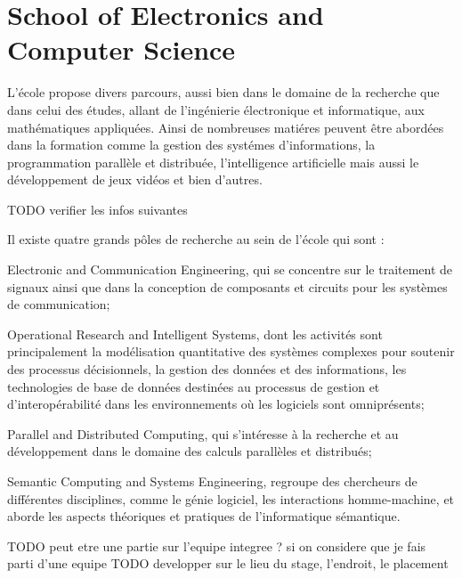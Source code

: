 \section{School of Electronics and Computer Science}

L'\'ecole propose divers parcours, aussi bien dans le domaine de la recherche que dans celui des \'etudes, allant de l'ing\'enierie \'electronique et informatique, aux math\'ematiques appliqu\'ees.
Ainsi de nombreuses mati\'eres peuvent \^etre abord\'ees dans la formation comme la gestion des syst\'emes d'informations, la programmation parall\`ele et distribu\'ee, l'intelligence artificielle mais aussi le d\'eveloppement de jeux vid\'eos et bien d'autres.

TODO verifier les infos suivantes

Il existe quatre grands p\^oles de recherche au sein de l'\'ecole qui sont :

Electronic and Communication Engineering, qui se concentre sur le traitement de signaux ainsi que dans la conception de composants et circuits pour les syst\`emes de communication;

Operational Research and Intelligent Systems, dont les activit\'es sont principalement la mod\'elisation quantitative des syst\`emes complexes pour soutenir des processus d\'ecisionnels, la gestion des donn\'ees et des informations, les technologies de base de donn\'ees destin\'ees au processus de gestion et d'interop\'erabilit\'e dans les environnements o\`u les logiciels sont omnipr\'esents;

Parallel and Distributed Computing, qui s'int\'eresse \`a la recherche et au d\'eveloppement dans le domaine des calculs parall\`eles et distribu\'es;

Semantic Computing and Systems Engineering, regroupe des chercheurs de diff\'erentes disciplines, comme le g\'enie logiciel, les interactions homme-machine, et aborde les aspects th\'eoriques et pratiques de l'informatique s\'emantique.

TODO peut etre une partie sur l'equipe integree ? si on considere que je fais parti d'une equipe
TODO developper sur le lieu du stage, l'endroit, le placement

\clearpage
